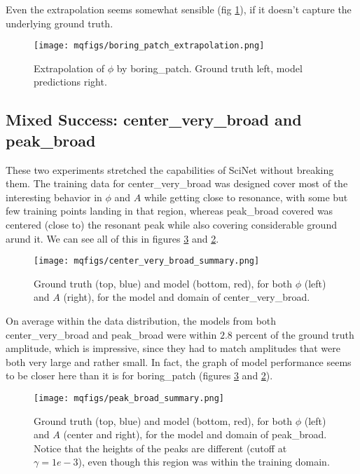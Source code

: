 \documentclass[aps,prl,preprint,groupedaddress]{revtex4-1}
\begin{document}
Even the extrapolation seems somewhat sensible (fig \ref{boringExtrapolation}), if it doesn't capture the underlying ground truth.

\begin{figure}[h]
   \centering
   \texttt{[image: mqfigs/boring\_patch\_extrapolation.png]}
   \caption{\label{boringExtrapolation} Extrapolation of $\phi$ by boring\_patch. Ground truth left, model predictions right.}
\end{figure}

\subsection{ Mixed Success: center\_very\_broad and peak\_broad}

These two experiments stretched the capabilities of SciNet without breaking them. The training data for center\_very\_broad was designed cover most of the interesting behavior in $\phi$ and $A$ while getting close to resonance, with some but few training points landing in that region, whereas peak\_broad covered was centered (close to) the resonant peak while also covering considerable ground arund it. We can see all of this in figures \ref{peakBroadSummary} and \ref{centerSummary}.

\begin{figure}[h]
   \centering
   \texttt{[image: mqfigs/center\_very\_broad\_summary.png]}
   \caption{\label{centerSummary} Ground truth (top, blue) and model (bottom, red), for both $\phi$ (left) and $A$ (right), for the model and domain of center\_very\_broad.}
\end{figure}

On average within the data distribution, the models from both center\_very\_broad and peak\_broad were within $2.8$ percent of the ground truth amplitude, which is impressive, since they had to match amplitudes that were both very large and rather small. In fact, the graph of model performance seems to be closer here than it is for boring\_patch (figures \ref{peakBroadSummary} and \ref{centerSummary}).

\begin{figure}[h]
   \centering
   \texttt{[image: mqfigs/peak\_broad\_summary.png]}
   \caption{\label{peakBroadSummary} Ground truth (top, blue) and model (bottom, red), for both $\phi$ (left) and $A$ (center and right), for the model and domain of peak\_broad. Notice that the heights of the peaks are different (cutoff at $\gamma = 1e-3$), even though this region was within the training domain.}
\end{figure}
\end{document}
